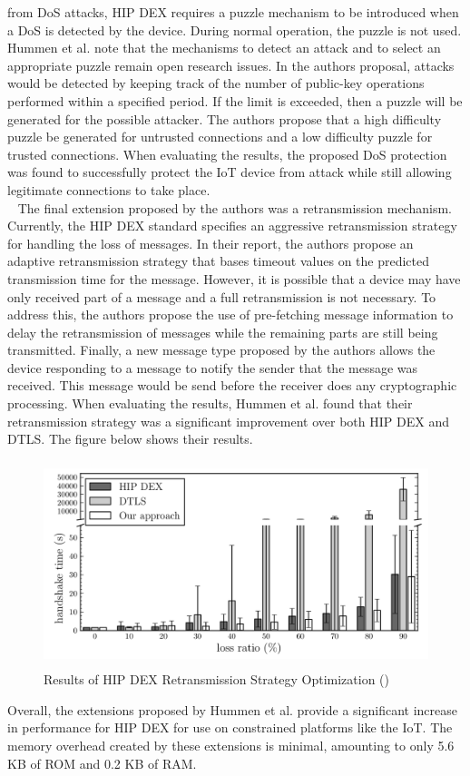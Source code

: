\documentclass[letterpaper, 12pt]{article}
\begin{document}
\begin{flushleft}
from DoS attacks, HIP DEX requires a puzzle mechanism to be introduced when a DoS is detected by the device. During normal operation, the puzzle is not used.
Hummen et al. note that the mechanisms to detect an attack and to select an appropriate puzzle remain open research issues. In the authors proposal, attacks
would be detected by keeping track of the number of public-key operations performed within a specified period. If the limit is exceeded, then a puzzle will
be generated for the possible attacker. The authors propose that a high difficulty puzzle be generated for untrusted connections and a low difficulty puzzle
for trusted connections. When evaluating the results, the proposed DoS protection was found to successfully protect the IoT device from attack while still
allowing legitimate connections to take place. \\
~\newline
The final extension proposed by the authors was a retransmission mechanism. Currently, the HIP DEX standard specifies an aggressive retransmission strategy
for handling the loss of messages. In their report, the authors propose an adaptive retransmission strategy that bases timeout values on the 
predicted transmission time for the message. However, it is possible that a device may have only received part of a message and a full retransmission
is not necessary. To address this, the authors propose the use of pre-fetching message information to delay the retransmission of messages while the 
remaining parts are still being transmitted. Finally, a new message type proposed by the authors allows the device responding to a message to notify the
sender that the message was received. This message would be send before the receiver does any cryptographic processing. When evaluating the results, 
Hummen et al. found that their retransmission strategy was a significant improvement over both HIP DEX and DTLS. The figure below shows their results.

\begin{figure}[H]
	\includegraphics[width=\linewidth,height=6cm,keepaspectratio]{figure7.png}
	\caption{Results of HIP DEX Retransmission Strategy Optimization (\cite{Hummen})}
	\label{fig:arch}
\end{figure}

Overall, the extensions proposed by Hummen et al. provide a significant increase in performance for HIP DEX for use on constrained platforms like the 
IoT. The memory overhead created by these extensions is minimal, amounting to only 5.6 KB of ROM and 0.2 KB of RAM. 

\newpage
{}
\printbibliography
\end{flushleft}
\end{document}
